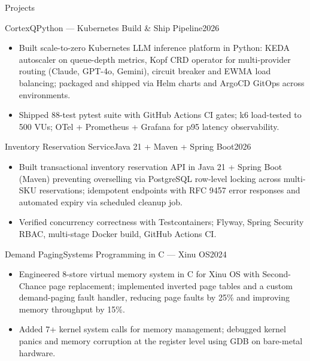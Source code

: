 \documentclass[]{mcdowellcv}
\begin{document}
\begin{cvsection}{Projects}
  \begin{cvsubsection}{CortexQ}{Python --- Kubernetes Build \& Ship Pipeline}{2026}
    \begin{itemize}
      \item Built scale-to-zero Kubernetes LLM inference platform in Python: KEDA autoscaler on queue-depth metrics, Kopf CRD operator for multi-provider routing (Claude, GPT-4o, Gemini), circuit breaker and EWMA load balancing; packaged and shipped via Helm charts and ArgoCD GitOps across environments.
      \item Shipped 88-test pytest suite with GitHub Actions CI gates; k6 load-tested to 500 VUs; OTel + Prometheus + Grafana for p95 latency observability.
    \end{itemize}
    \vspace{-1.5pt}
  \end{cvsubsection}

  \begin{cvsubsection}{Inventory Reservation Service}{Java 21 + Maven + Spring Boot}{2026}
    \begin{itemize}
      \item Built transactional inventory reservation API in Java 21 + Spring Boot (Maven) preventing overselling via PostgreSQL row-level locking across multi-SKU reservations; idempotent endpoints with RFC 9457 error responses and automated expiry via scheduled cleanup job.
      \item Verified concurrency correctness with Testcontainers; Flyway, Spring Security RBAC, multi-stage Docker build, GitHub Actions CI.
    \end{itemize}
    \vspace{-1.5pt}
  \end{cvsubsection}

  \begin{cvsubsection}{Demand Paging}{Systems Programming in C --- Xinu OS}{2024}
    \begin{itemize}
      \item Engineered 8-store virtual memory system in C for Xinu OS with Second-Chance page replacement; implemented inverted page tables and a custom demand-paging fault handler, reducing page faults by 25\% and improving memory throughput by 15\%.
      \item Added 7+ kernel system calls for memory management; debugged kernel panics and memory corruption at the register level using GDB on bare-metal hardware.
    \end{itemize}
  \end{cvsubsection}
\end{cvsection}
\end{document}
